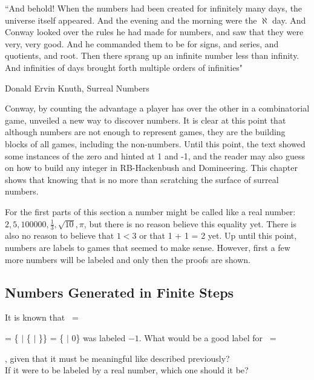 \epigraph{``And behold! When the numbers had been created for infinitely many days, the universe itself appeared. And the evening and the morning were the $\aleph$ day. And Conway looked over the rules he had made for numbers, and saw that they were very, very good. And he commanded them to be for signs, and series, and quotients, and root. Then there sprang up an infinite number less than infinity. And infinities of days brought forth multiple orders of infinities"}{Donald Ervin Knuth, Surreal Numbers \footnotemark}



Conway, by counting the advantage a player has over the other in a combinatorial game, unveiled a new way to discover numbers. It is clear at this point that although numbers are not enough to represent games, they are the building blocks of all games, including the non-numbers. Until this point, the text showed some instances of the zero and hinted at 1 and -1, and the reader may also guess on how to build any integer in RB-Hackenbush and Domineering. This chapter shows that knowing that is no more than scratching the surface of surreal numbers.

For the first parts of this section a number  might be called like a real number: $2, 5, 100000, \frac{1}{3}, \sqrt{10}, \pi$, but there is no reason believe this equality yet. There is also no reason to believe that $1 < 3$ or that 1 + 1 = 2 yet. Up until this point, numbers are labels to games that seemed to make sense. However, first a few more numbers will be labeled and only then the proofs are shown.


\subsection*{Numbers Generated in Finite Steps}

It is known that \Gm\ =
 = \{ $|$ \{ $|$ \}\} = \{ $|$ 0\} was labeled $-1$.
What would be a good label for \Hm\ = , given that it must be meaningful like described previously?\\ If it were to be labeled by a real number, which one should it be?


